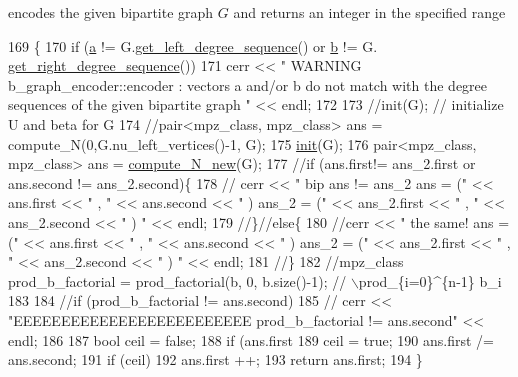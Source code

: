 encodes the given bipartite graph $G$ and returns an integer in the specified range 


\begin{DoxyCode}
169 \{
170   \textcolor{keywordflow}{if} (\hyperlink{classb__graph__encoder_afd22d167f495cd85b41397f337c377c2}{a} != G.\hyperlink{classb__graph_afd65fb655f7e24217393a10533b87d3c}{get\_left\_degree\_sequence}() or \hyperlink{classb__graph__encoder_a767826e268702e45ab71565e096a52b8}{b} != G.
      \hyperlink{classb__graph_a2711566385b92b02f4c03abdc1f9a582}{get\_right\_degree\_sequence}())
171     cerr << \textcolor{stringliteral}{" WARNING b\_graph\_encoder::encoder : vectors a and/or b do not match with the degree sequences
       of the given bipartite graph  "} << endl;
172 
173   \textcolor{comment}{//init(G); // initialize U and beta for G}
174   \textcolor{comment}{//pair<mpz\_class, mpz\_class> ans = compute\_N(0,G.nu\_left\_vertices()-1, G);}
175   \hyperlink{classb__graph__encoder_a9b62ac0580191ac42b98d764046af7cb}{init}(G);
176   pair<mpz\_class, mpz\_class> ans = \hyperlink{classb__graph__encoder_abb9153c776f8c9ec9aeb6361080e84d4}{compute\_N\_new}(G);
177   \textcolor{comment}{//if (ans.first!= ans\_2.first or ans.second != ans\_2.second)\{}
178   \textcolor{comment}{//  cerr << " bip ans != ans\_2 ans = (" << ans.first << " , " << ans.second <<  " ) ans\_2 = (" <<
       ans\_2.first << " , " << ans\_2.second << " ) "  << endl;}
179   \textcolor{comment}{//\}//else\{}
180   \textcolor{comment}{//cerr << " the same! ans = (" << ans.first << " , " << ans.second <<  " ) ans\_2 = (" << ans\_2.first << "
       , " << ans\_2.second << " ) "  << endl;}
181   \textcolor{comment}{//\}}
182   \textcolor{comment}{//mpz\_class prod\_b\_factorial = prod\_factorial(b, 0, b.size()-1); // \(\backslash\)prod\_\{i=0\}^\{n-1\} b\_i}
183 
184   \textcolor{comment}{//if (prod\_b\_factorial != ans.second)}
185   \textcolor{comment}{//  cerr << "EEEEEEEEEEEEEEEEEEEEEEEEE prod\_b\_factorial != ans.second" << endl;}
186 
187   \textcolor{keywordtype}{bool} ceil = \textcolor{keyword}{false};
188   \textcolor{keywordflow}{if} (ans.first %
189     ceil = \textcolor{keyword}{true};
190   ans.first /= ans.second;
191   \textcolor{keywordflow}{if} (ceil)
192     ans.first ++;
193   \textcolor{keywordflow}{return} ans.first;
194 \}
\end{DoxyCode}
\mbox{\label{classb__graph__encoder_a9b62ac0580191ac42b98d764046af7cb}} 
